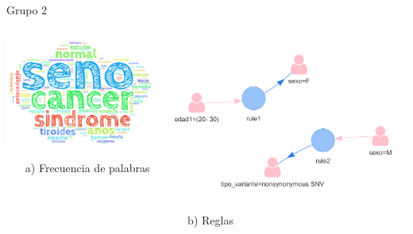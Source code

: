 \documentclass[xcolor=dvipsnames]{beamer}
\begin{document}
\begin{frame}{Grupo 2}

\begin{columns}
\begin{column}{0.5\textwidth}
\begin{center}
\includegraphics[width=1\textwidth]{cluster2} \\
\begin{itemize}
    \item[a)] Frecuencia de palabras
\end{itemize}
\end{center}
\end{column}
\begin{column}{0.5\textwidth}  %
    \begin{center}
     \includegraphics[width=1\textwidth]{reglas2_2.png}
    \begin{itemize}
    \centering
    \item[b)] Reglas
    \end{itemize}
    \end{center}
\end{column}
\end{columns}
\end{frame}
\end{document}

